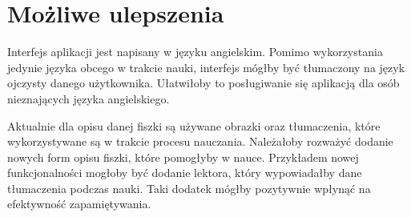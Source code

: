 \section{Możliwe ulepszenia}

Interfejs aplikacji jest napisany w języku angielskim. Pomimo wykorzystania jedynie języka obcego w trakcie nauki, interfejs mógłby być tłumaczony na język ojczysty danego użytkownika. Ułatwiłoby to posługiwanie się aplikacją dla osób nieznających języka angielskiego.

Aktualnie dla opisu danej fiszki są używane obrazki oraz tłumaczenia, które wykorzystywane są w trakcie procesu nauczania. Należałoby rozważyć dodanie nowych form opisu fiszki, które pomogłyby w nauce. Przykładem nowej funkcjonalności mogłoby być dodanie lektora, który wypowiadałby dane tłumaczenia podczas nauki. Taki dodatek mógłby pozytywnie wpłynąć na efektywność zapamiętywania.